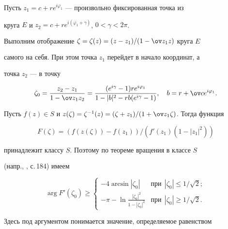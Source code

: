  


\begin{pf} 


Пусть $z_1=c+r e^{i\varphi_1}$ --- произвольно фиксированная точка из 


круга $E$ и $z_2=c+r e^{i(\varphi_1+\gamma)}$, $0<\gamma<2\pi$. 


Выполним отображение $\zeta=\zeta(z)=(z-z_1)/(1-\ov z_1z)$ круга $E$ 


самого на себя. При этом точка $z_1$ перейдет в начало координат, а 


точка $z_2$ --- в точку 


$$ 


\zeta_0=\frac{z_2-z_1}{1-\ov z_1z_2}= 


\frac{(e^{i\gamma}-1)r e^{i\varphi_1}} 


{1-|b|^2-r b(e^{i\gamma}-1)},\quad 


b=r+\ov c e^{i\varphi_1}. 


$$ 


Пусть $f(z)\in S$ и $z(\zeta)=\zeta^{-1}(z)=(\zeta+z_1)/(1+\ov 


z_1\zeta)$. Тогда функция 


\begin{equation} 


F(\zeta)=(f(z(\zeta))-f(z_1))/(f'(z_1)(1-|z_1|^2)) 


\end{equation} 


принадлежит классу $S$. Поэтому по теореме вращения в классе $S$


(напр., \cite{5}, с.\,184) имеем 


\begin{equation} 


\arg F'(\zeta_0)\ge 


\begin{cases} 


-4\arcsin|\zeta_0| & \text{при}\ \ |\zeta_0|\le1/\sqrt{2}; \\ 


-\pi-\ln\frac{|\zeta_0|^2}{1-|\zeta_0|^2} & \text{при} 


\ \ |\zeta_0|\ge1/\sqrt{2}. 


\end{cases} 


\end{equation} 


Здесь под аргументом понимается значение, определяемое равенством 


$$ 



\end{pf}
